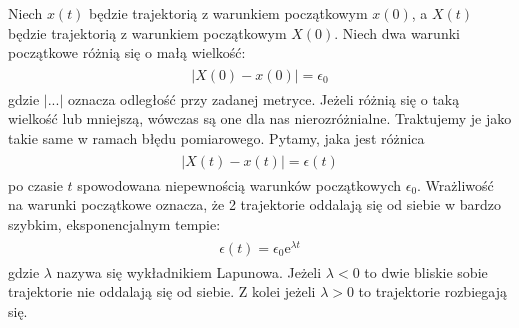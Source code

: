 \documentclass[a4paper,12pt,polish]{sphinxmanual}
\begin{document}
Niech $x(t)$  będzie trajektorią z warunkiem początkowym $x(0)$, a $X(t)$
będzie trajektorią z warunkiem początkowym $X(0)$.   Niech dwa warunki początkowe różnią się o małą wielkość:
\label{ch2/chII012:equation-eqn1}\begin{gather}
\begin{split}|X(0) - x(0)| = \epsilon_0\end{split}\label{ch2/chII012-eqn1}
\end{gather}
gdzie $| ... |$ oznacza odległość przy zadanej metryce.  Jeżeli różnią się o taką wielkość lub mniejszą, wówczas są one  dla nas nierozróżnialne. Traktujemy je jako takie same w ramach błędu pomiarowego. Pytamy, jaka jest różnica
\label{ch2/chII012:equation-eqn2}\begin{gather}
\begin{split}|X(t) - x(t)| = \epsilon(t)\end{split}\label{ch2/chII012-eqn2}
\end{gather}
po czasie $t$ spowodowana niepewnością warunków początkowych $\epsilon_0$. Wrażliwość na warunki początkowe oznacza, że 2 trajektorie oddalają się od siebie w bardzo szybkim, eksponencjalnym tempie:
\label{ch2/chII012:equation-eqn3}\begin{gather}
\begin{split}\epsilon(t) = \epsilon_0  \mbox{e}^{\lambda t}\end{split}\label{ch2/chII012-eqn3}
\end{gather}
gdzie $\lambda$ nazywa się wykładnikiem Lapunowa. Jeżeli $\lambda < 0$ to dwie bliskie sobie trajektorie nie oddalają się od siebie. Z kolei jeżeli $\lambda > 0$ to trajektorie rozbiegają się.
\end{document}
